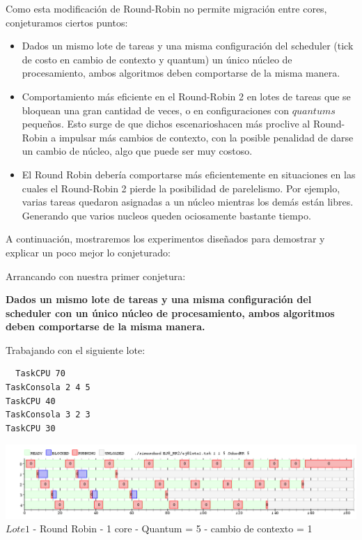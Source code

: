 \indent \indent Como esta modificación de Round-Robin no permite migración entre cores, 
conjeturamos ciertos puntos:\\
\begin{itemize}
 \item Dados un mismo lote de tareas y una misma configuración del scheduler (tick de costo en cambio de contexto y quantum)
 un único núcleo de procesamiento,  ambos algoritmos deben comportarse de la misma manera. 
  \item Comportamiento más eficiente en el Round-Robin 2 en lotes de tareas que se bloquean una gran cantidad de veces, o  en configuraciones con $quantums$ pequeños. 
  Esto surge de que dichos escenarioshacen más proclive al Round-Robin a impulsar más cambios de contexto, 
  con la posible penalidad de darse un cambio de núcleo, algo que puede ser muy costoso.
  \item El Round Robin debería comportarse más eficientemente en situaciones en las cuales el Round-Robin 2 pierde la posibilidad de parelelismo. 
  Por ejemplo, varias tareas quedaron asignadas a un núcleo mientras los demás están libres. Generando que varios nucleos queden ociosamente bastante tiempo.
  
 \end{itemize}

 \indent A continuación, mostraremos los experimentos diseñados para demostrar y explicar un poco mejor lo conjeturado:
 
 \indent Arrancando con nuestra primer conjetura:
 
 \begin{center}
  \textbf{Dados un mismo lote de tareas y una misma configuración del scheduler con un único núcleo de procesamiento, 
 ambos algoritmos deben comportarse de la misma manera. }
 \end{center}

 
 \indent Trabajando con el siguiente lote:
 
 \begin{verbatim}
  TaskCPU 70
TaskConsola 2 4 5
TaskCPU 40
TaskConsola 3 2 3
TaskCPU 30
 \end{verbatim}

  \begin{center}
    	\includegraphics[width=450pt]{./EJ8_RR2/dif1corerr.png}
	{$Lote 1$ - Round Robin - 1 core - Quantum = 5 - cambio de contexto = 1}	
 \end{center}
 
